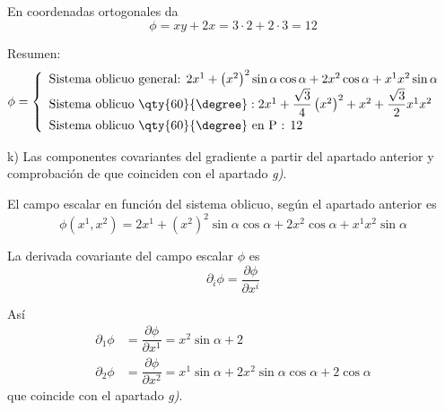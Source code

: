 En coordenadas ortogonales da
\[
  \phi
  = xy + 2x
  = 3\cdot 2 + 2 \cdot 3
  = 12
\]

\noindent
Resumen:
\[
  \phi =
  \begin{cases}
    \begin{array}{l}
      \text{Sistema oblicuo general: }
      2x^1 + \left(x^2\right)^2\sin\alpha\cos\alpha + 2x^2\cos\alpha + x^1x^2\sin\alpha\\
      \text{Sistema oblicuo \qty{60}{\degree}}:
      2x^1 + \dfrac{\sqrt{3}}{4}\left(x^2\right)^2 + x^2 + \dfrac{\sqrt{3}}{2}x^1x^2\\
      \text{Sistema oblicuo \qty{60}{\degree} en } $P$ \text{ : }
      12
    \end{array}
  \end{cases}
\]

\noindent
k) Las componentes covariantes del gradiente a partir del apartado anterior y comprobación de que coinciden con el apartado \emph{g)}.

El campo escalar en función del sistema oblicuo, según el apartado anterior es
\[
  \phi(x^1,x^2)
  = 2x^1 + \left(x^2\right)^2\sin\alpha\cos\alpha + 2x^2\cos\alpha + x^1x^2\sin\alpha
\]

La derivada covariante del campo escalar $\phi$ es
\[
  \partial_i\phi = \dfrac{\partial\phi}{\partial x^i}
\]

Así
\begin{align*}
  \partial_1\phi
  &=
    \dfrac{\partial\phi}{\partial x^1}
    = x^2 \sin\alpha + 2\\
  \partial_2\phi
  &=
    \dfrac{\partial\phi}{\partial x^2}
    = x^1\sin\alpha + 2x^2 \sin\alpha\cos\alpha + 2\cos\alpha
\end{align*}
que coincide con el apartado \emph{g)}.









